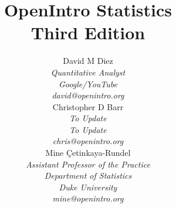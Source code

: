 
\title{\huge OpenIntro Statistics\vspace{1.5mm} \\ \Large Third Edition}
\author{David M Diez \\
\small\emph{Quantitative Analyst} \\
\small\emph{Google/YouTube} \\
\vspace{6mm}%
\small\emph{david@openintro.org} \\
Christopher D Barr \\
\small\emph{\color{red}To Update} \\
\small\emph{\color{red}To Update} \\
\vspace{6mm}%
\small\emph{chris@openintro.org} \\
Mine \c{C}etinkaya-Rundel \\
\small\emph{Assistant Professor of the Practice} \\
\small\emph{Department of Statistics} \\
\small\emph{Duke University} \\
\small\emph{mine@openintro.org}}
